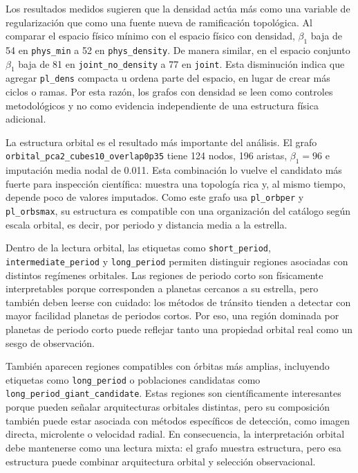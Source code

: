 Los resultados medidos sugieren que la densidad actúa más como una variable de regularización que como una fuente nueva de ramificación topológica. Al comparar el espacio físico mínimo con el espacio físico con densidad, \(\beta_1\) baja de 54 en \texttt{phys\_min} a 52 en \texttt{phys\_density}. De manera similar, en el espacio conjunto \(\beta_1\) baja de 81 en \texttt{joint\_no\_density} a 77 en \texttt{joint}. Esta disminución indica que agregar \texttt{pl\_dens} compacta u ordena parte del espacio, en lugar de crear más ciclos o ramas. Por esta razón, los grafos con densidad se leen como controles metodológicos y no como evidencia independiente de una estructura física adicional.

La estructura orbital es el resultado más importante del análisis. El grafo \texttt{orbital\_pca2\_cubes10\_overlap0p35} tiene 124 nodos, 196 aristas, \(\beta_1=96\) e imputación media nodal de 0.011. Esta combinación lo vuelve el candidato más fuerte para inspección científica: muestra una topología rica y, al mismo tiempo, depende poco de valores imputados. Como este grafo usa \texttt{pl\_orbper} y \texttt{pl\_orbsmax}, su estructura es compatible con una organización del catálogo según escala orbital, es decir, por periodo y distancia media a la estrella.

Dentro de la lectura orbital, las etiquetas como \texttt{short\_period}, \texttt{intermediate\_period} y \texttt{long\_period} permiten distinguir regiones asociadas con distintos regímenes orbitales. Las regiones de periodo corto son físicamente interpretables porque corresponden a planetas cercanos a su estrella, pero también deben leerse con cuidado: los métodos de tránsito tienden a detectar con mayor facilidad planetas de periodos cortos. Por eso, una región dominada por planetas de periodo corto puede reflejar tanto una propiedad orbital real como un sesgo de observación.

También aparecen regiones compatibles con órbitas más amplias, incluyendo etiquetas como \texttt{long\_period} o poblaciones candidatas como \texttt{long\_period\_giant\_candidate}. Estas regiones son científicamente interesantes porque pueden señalar arquitecturas orbitales distintas, pero su composición también puede estar asociada con métodos específicos de detección, como imagen directa, microlente o velocidad radial. En consecuencia, la interpretación orbital debe mantenerse como una lectura mixta: el grafo muestra estructura, pero esa estructura puede combinar arquitectura orbital y selección observacional.

